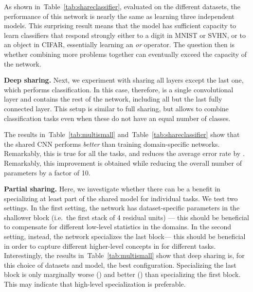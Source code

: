 \documentclass[10pt,twocolumn,letterpaper]{article}
\renewcommand{\paragraph}[1]{\par\medskip\noindent\textbf{#1}}
\begin{document}
As shown in~Table~\ref{tab:shareclassifier}, evaluated on the different datasets, the performance of this network is nearly the same as learning three independent models. This surprising result means that the model has sufficient capacity to learn classifiers that respond strongly either to a digit in MNIST or SVHN, or to an object in CIFAR, essentially learning an \emph{or} operator. The question then is whether combining more problems together can eventually exceed the capacity of the network.

\paragraph{Deep sharing.} Next, we experiment with sharing all layers except the last one, which  performs classification. In this case, therefore,  is a single convolutional layer and  contains the rest of the network, including all but the last fully connected layer. This setup is similar to full sharing, but allows to combine classification tasks even when these do not have an equal number of classes.

The results in~Table~\ref{tab:multismall} and~Table~\ref{tab:shareclassifier} show that the shared CNN performs \emph{better} than training domain-specific networks. Remarkably, this is true for all the tasks, and reduces the average error rate by . Remarkably, this improvement is obtained while reducing the overall number of parameters by a factor of 10.

\paragraph{Partial sharing.} Here, we investigate whether there can be a benefit in specializing at least part of the shared model for individual tasks. We test two settings. In the first setting, the network has dataset-specific parameters in the shallower block (i.e.\ the first stack of 4 residual units) --- this should be beneficial to compensate for different low-level statistics in the domains.  In the second setting, instead, the network specializes the last block--- this should be beneficial in order to capture different higher-level concepts in for different tasks. Interestingly, the results in~Table~\ref{tab:multismall} show that deep sharing is, for this choice of datasets and model, the best configuration. Specializing the last block is only marginally worse () and better () than specializing the first block. This may indicate that high-level specialization is preferable.
\end{document}
